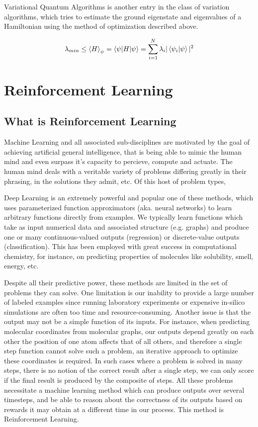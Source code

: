 Variational Quantum Algorithms is another entry in the class of variation algorithms, which tries to estimate the ground eigenstate and eigenvalues of a Hamiltonian using the method of optimization described above.

\begin{equation}
    \lambda_{min} \leq \braket{H}_{\psi} = \braket{\psi \vert H \vert \psi} = \sum_{i=1}^{N} \lambda_i \vert \braket{\psi_i \vert \psi} \vert ^2
\end{equation}

\section{Reinforcement Learning}

\subsection{What is Reinforcement Learning}

Machine Learning and all associated sub-disciplines are motivated by the goal of achieving artificial general intelligence, that is being able to mimic the human mind and even surpass it's capacity to percieve, compute and actuate. The human mind deals with a veritable variety of problems differing greatly in their phrasing, in the solutions they admit, etc. Of this host of problem types, 

Deep Learning is an extremely powerful and popular one of these methods, which uses parameterized function approximators (aka. neural networks) to learn arbitrary functions directly from examples. We typically learn functions which take as input numerical data and associated structure (e.g. graphs) and produce one or many continuous-valued outputs (regression) or discrete-value outputs (classification). This has been employed with great success in computational chemistry, for instance, on predicting properties of molecules like solubility, smell, energy, etc. %

Despite all their predictive power, these methods are limited in the set of problems they can solve. One limitation is our inability to provide a large number of labeled examples since running laboratory experiments or expensive in-silico simulations are often too time and resource-consuming. Another issue is that the output may not be a simple function of its inputs. For instance, when predicting molecular coordinates from molecular graphs, our outputs depend greatly on each other the position of one atom affects that of all others, and therefore a single step function cannot solve such a problem, an iterative approach to optimize these coordinates is required. In such cases where a problem is solved in many steps, there is no notion of the correct result after a single step, we can only score if the final result is produced by the composite of steps. All these problems necessitate a machine learning method which can produce outputs over several timesteps, and be able to reason about the correctness of its outputs based on rewards it may obtain at a different time in our process. This method is Reinforcement Learning. \cite{rl-intro-sutton-barto}


